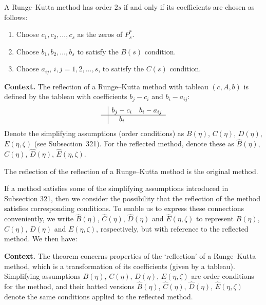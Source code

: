 \begin{corollary}

  \label{cor:342D}
A Runge--Kutta method has order $2s$ if and only if its coefficients are chosen as follows:
\begin{enumerate}
    \item[(i)] Choose $c_{1}, c_{2}, \dots, c_{s}$ as the zeros of $P_{s}^{*}$.
    \item[(ii)] Choose $b_{1}, b_{2}, \dots, b_{s}$ to satisfy the $B(s)$ condition.
    \item[(iii)] Choose $a_{ij}$, $i, j = 1, 2, \dots, s$, to satisfy the $C(s)$ condition.
\end{enumerate}
\end{corollary}

\noindent\textbf{Context.}
The reflection of a Runge--Kutta method with tableau $(c,A,b)$ is defined by the tableau with coefficients $b_j-c_i$ and $b_i-a_{ij}$:
\begin{equation}
\label{343a}
\begin{array}{c|cc}
 & b_j-c_i & b_i-a_{ij} \\
\hline
 & b_i
\end{array}
\end{equation}
Denote the simplifying assumptions (order conditions) as $B(\eta)$, $C(\eta)$, $D(\eta)$, $E(\eta,\zeta)$ (see Subsection~321). For the reflected method, denote these as $\widehat{B}(\eta)$, $\widehat{C}(\eta)$, $\widehat{D}(\eta)$, $\widehat{E}(\eta,\zeta)$.

\begin{theorem}

  \label{thm:343A}
  \uses{}
The reflection of the reflection of a Runge--Kutta method is the original method.

If a method satisfies some of the simplifying assumptions introduced in Subsection 321, then we consider the possibility that the reflection of the method satisfies corresponding conditions. To enable us to express these connections conveniently, we write $\widehat{B}(\eta)$, $\widehat{C}(\eta)$, $\widehat{D}(\eta)$ and $\widehat{E}(\eta,\zeta)$ to represent $B(\eta)$, $C(\eta)$, $D(\eta)$ and $E(\eta,\zeta)$, respectively, but with reference to the reflected method. We then have:
\end{theorem}

\noindent\textbf{Context.}
The theorem concerns properties of the `reflection' of a Runge--Kutta method, which is a transformation of its coefficients (given by a tableau). Simplifying assumptions $B(\eta)$, $C(\eta)$, $D(\eta)$, $E(\eta,\zeta)$ are order conditions for the method, and their hatted versions $\widehat{B}(\eta)$, $\widehat{C}(\eta)$, $\widehat{D}(\eta)$, $\widehat{E}(\eta,\zeta)$ denote the same conditions applied to the reflected method.

